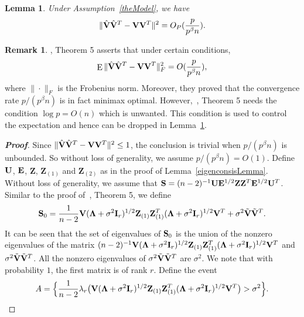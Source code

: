 \documentclass[3p]{elsarticle}
\DeclareMathOperator{\myE}{E}
\newcommand{\bZ}{\mathbf{Z}}
\theoremstyle{plain}
\newtheorem{lemma}{\quad\quad Lemma}
\theoremstyle{definition}
\newtheorem{remark}{\quad\quad Remark}
\theoremstyle{remark}
\begin{document}
\begin{appendices}
\begin{lemma}\label{conRateLemma}
    Under Assumption~\ref{theModel}, we have
\begin{equation*}
\|\hat{\mathbf{V}}\hat{\mathbf{V}}^T-\mathbf{V}\mathbf{V}^T\|^2 =O_P(\frac{p}{p^{\beta}n}).
\end{equation*}
\end{lemma}
\begin{remark}
\cite{Cai2012Sparse}, Theorem 5 asserts that under certain conditions,
$$
\myE \|\hat{\BV}\hat{\BV}^T-\BV\BV^T\|_F^2 =O(\frac{p}{p^{\beta}n}),
    $$
    where $\|\cdot\|_F$ is the Frobenius norm.
    Moreover, they proved that the convergence rate $p/(p^{\beta}n)$ is in fact minimax optimal.
    However,~\cite{Cai2012Sparse}, Theorem 5 needs the condition $\log p=O(n)$ which is unwanted.
    This condition is used to control the expectation and hence can be dropped in Lemma~\ref{conRateLemma}.
\end{remark}
\begin{proof}[\textbf{Proof}]
    Since $\|\hat{\mathbf{V}}\hat{\mathbf{V}}^T-\mathbf{V}\mathbf{V}^T\|^2\leq 1$, the conclusion is trivial when $p/(p^{\beta} n)$ is unbounded.
    So without loss of generality, we assume $p/(p^{\beta} n)=O(1)$.
    Define $\mathbf{U}$, $\mathbf{E}$, $\bZ$, $\bZ_{(1)}$ and $\bZ_{(2)}$ as in the proof of Lemma~\ref{eigenconsisLemma}.
Without loss of generality, we assume that $\BS= (n-2)^{-1}\BU\BE^{1/2}\bZ \bZ^T \BE^{1/2} \BU^T$. 
    Similar to the proof of~\cite{Cai2012Sparse}, Theorem 5,
we define 
    $$
    \BS_0=
        \frac{1}{n-2}\BV(\bLambda+\sigma^2\BI_r)^{1/2}\bZ_{(1)} \bZ_{(1)}^T(\bLambda+\sigma^2\BI_r)^{1/2}\BV^T
        +\sigma^2\tilde{\BV}\tilde{\BV}^T.
    $$
    It can be seen that the set of eigenvalues of $\mathbf{S}_0$ is the union of the nonzero eigenvalues of the matrix $(n-2)^{-1}\BV(\bLambda+\sigma^2\BI_r)^{1/2}\bZ_{(1)} \bZ_{(1)}^T(\bLambda+\sigma^2\BI_r)^{1/2}\BV^T$ and $\sigma^2\tilde{\mathbf{V}}\tilde{\mathbf{V}}^T$.
All the nonzero eigenvalues of $\sigma^2\tilde{\mathbf{V}}\tilde{\mathbf{V}}^T$ are $\sigma^2$.
We note that with probability $1$, the first matrix is of rank $r$.
        Define the event
        $$
        A=
        \Big\{
        \frac{1}{n-2}\lambda_r\big(\BV(\bLambda+\sigma^2 \BI_r)^{1/2}\bZ_{(1)} \bZ_{(1)}^T(\bLambda+\sigma^2 \BI_r)^{1/2}\BV^T\big)
        >\sigma^2
        \Big\}.
$$
\end{proof}
\end{appendices}
\end{document}
